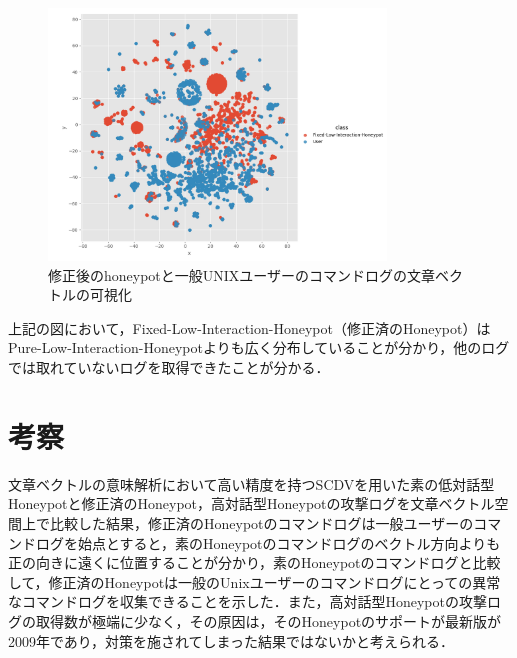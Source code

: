 \vspace{10mm}
\begin{figure}[htbp]
    \centering
    \includegraphics[width=0.8\textwidth]{figures/fixuser.png}
    \caption{修正後のhoneypotと一般UNIXユーザーのコマンドログの文章ベクトルの可視化}
    \label{fig:tsne3}
\end{figure}
\vspace{10mm}
\clearpage

上記の図において，Fixed-Low-Interaction-Honeypot（修正済のHoneypot）はPure-Low-Interaction-Honeypotよりも広く分布していることが分かり，他のログでは取れていないログを取得できたことが分かる．


\section{考察}
\label{eval:implkosatu}
文章ベクトルの意味解析において高い精度を持つ\cite{scdv}SCDVを用いた素の低対話型Honeypotと修正済のHoneypot，高対話型Honeypotの攻撃ログを文章ベクトル空間上で比較した結果，修正済のHoneypotのコマンドログは一般ユーザーのコマンドログを始点とすると，素のHoneypotのコマンドログのベクトル方向よりも正の向きに遠くに位置することが分かり，素のHoneypotのコマンドログと比較して，修正済のHoneypotは一般のUnixユーザーのコマンドログにとっての異常なコマンドログを収集できることを示した．また，高対話型Honeypotの攻撃ログの取得数が極端に少なく，その原因は，そのHoneypotのサポートが最新版が2009年であり，対策を施されてしまった結果ではないかと考えられる．









